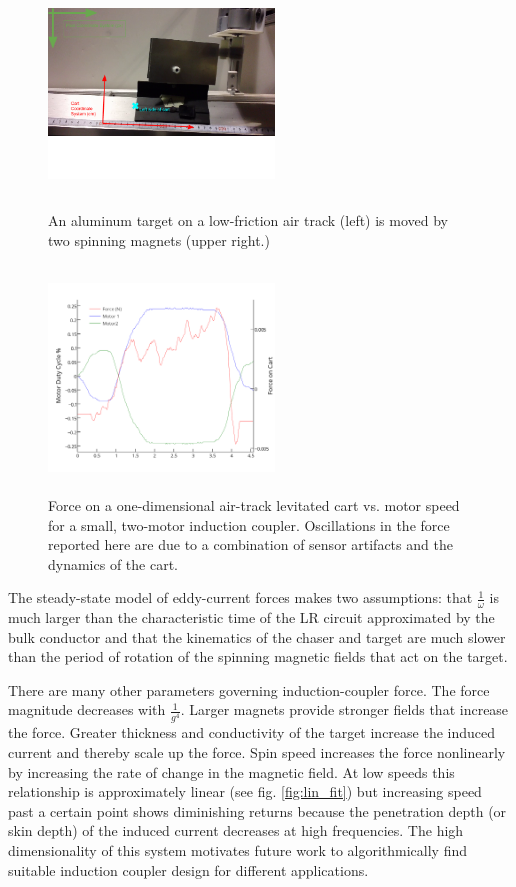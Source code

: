 \begin{figure}
\includegraphics[width = 6cm, height = 6cm ]{figures/cart_on_track.png}

\caption{An aluminum target on a low-friction air track (left) is moved by two spinning magnets (upper right.)}
\label{fig:cart_picture}
\end{figure}


\begin{figure}
\includegraphics[width = 6cm, height = 6cm ]{figures/motor_force_speed_plot.png}

\caption{Force on a one-dimensional air-track levitated cart vs. motor speed for a small, two-motor induction coupler. Oscillations in the force reported here are due to a combination of sensor artifacts and the dynamics of the cart.}
\label{fig:force_plot}
\end{figure}

The steady-state model of eddy-current forces makes two assumptions: that $\frac{1}{\omega}$ is much larger than the characteristic time of the LR circuit approximated by the bulk conductor and that the kinematics of the chaser and target are much slower than the period of rotation of the spinning magnetic fields that act on the target.

There are many other parameters governing induction-coupler force. The force magnitude decreases with $\frac{1}{g^4}$. Larger magnets provide stronger fields that increase the force. Greater thickness and 
conductivity of the target increase the induced current and thereby scale up the force. Spin speed increases the force nonlinearly by increasing the rate of change in the magnetic field. At low speeds this relationship is approximately linear (see fig. \ref{fig:lin_fit}) but increasing speed past a certain point shows diminishing returns because the penetration depth (or skin depth) of the induced current decreases at high frequencies. \cite{Paudel2013} The high dimensionality of this system motivates future work to algorithmically find suitable induction coupler design for different applications.
